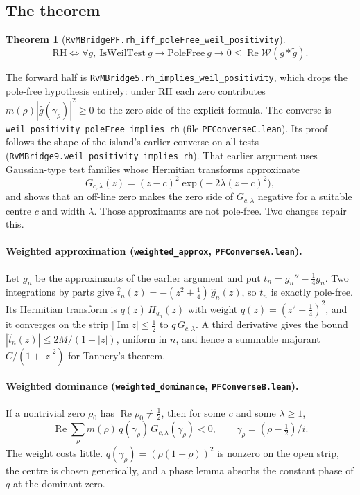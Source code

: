 \documentclass[11pt]{article}
\newtheorem{theorem}{Theorem}
\theoremstyle{definition}
\newcommand{\lean}[1]{\texttt{#1}}
\newcommand{\re}{\operatorname{Re}}
\newcommand{\im}{\operatorname{Im}}
\newcommand{\Weil}{\mathcal{W}}
\begin{document}
\subsection{The theorem}

\begin{theorem}[\lean{RvMBridgePF.rh\_iff\_poleFree\_weil\_positivity}]\label{thm:pf}
\[
\mathrm{RH} \iff \forall g,\ \mathrm{IsWeilTest}\ g \to \mathrm{PoleFree}\ g \to 0 \le \re \Weil(g * \tilde g).
\]
\end{theorem}

The forward half is \lean{RvMBridge5.rh\_implies\_weil\_positivity}, which drops the pole-free hypothesis entirely: under RH each zero contributes $m(\rho)|\hat g(\gamma_\rho)|^2 \ge 0$ to the zero side of the explicit formula. The converse is \lean{weil\_positivity\_poleFree\_implies\_rh} (file \lean{PFConverseC.lean}). Its proof follows the shape of the island's earlier converse on all tests (\lean{RvMBridge9.weil\_positivity\_implies\_rh}). That earlier argument uses Gaussian-type test families whose Hermitian transforms approximate
\[
G_{c,\lambda}(z) = (z-c)^2 \exp\bigl(-2\lambda (z-c)^2\bigr),
\]
and shows that an off-line zero makes the zero side of $G_{c,\lambda}$ negative for a suitable centre $c$ and width $\lambda$. Those approximants are not pole-free. Two changes repair this.

\paragraph{Weighted approximation (\lean{weighted\_approx}, \lean{PFConverseA.lean}).} Let $g_n$ be the approximants of the earlier argument and put $t_n = g_n'' - \tfrac14 g_n$. Two integrations by parts give $\hat t_n(z) = -(z^2 + \tfrac14)\,\hat g_n(z)$, so $t_n$ is exactly pole-free. Its Hermitian transform is $q(z)\,H_{g_n}(z)$ with weight $q(z) = (z^2+\tfrac14)^2$, and it converges on the strip $|\im z| \le \tfrac12$ to $q\,G_{c,\lambda}$. A third derivative gives the bound $|\hat t_n(z)| \le 2M/(1+|z|)$, uniform in $n$, and hence a summable majorant $C/(1+|z|^2)$ for Tannery's theorem.

\paragraph{Weighted dominance (\lean{weighted\_dominance}, \lean{PFConverseB.lean}).} If a nontrivial zero $\rho_0$ has $\re\rho_0 \ne \tfrac12$, then for some $c$ and some $\lambda \ge 1$,
\[
\re \sum_\rho m(\rho)\, q(\gamma_\rho)\, G_{c,\lambda}(\gamma_\rho) < 0, \qquad \gamma_\rho = (\rho - \tfrac12)/i .
\]
The weight costs little. $q(\gamma_\rho) = (\rho(1-\rho))^2$ is nonzero on the open strip, the centre is chosen generically, and a phase lemma absorbs the constant phase of $q$ at the dominant zero.
\end{document}
